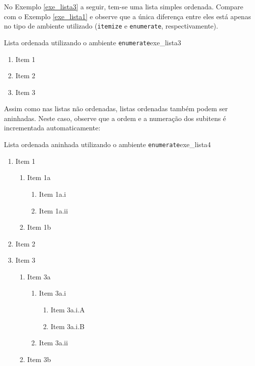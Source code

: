 No Exemplo \ref{exe_lista3} a seguir, tem-se uma lista simples ordenada. Compare com o Exemplo \ref{exe_lista1} e observe que a única diferença entre eles está apenas no tipo de ambiente utilizado ({\tt itemize} e {\tt enumerate}, respectivamente).

\begingroup
\renewcommand{\labelenumi}{\arabic{enumi}.}
\begin{texexptitled}[breakable,enhanced,middle=2mm]{Lista ordenada utilizando o ambiente \texttt{enumerate}}{exe_lista3}
\begin{enumerate}
    \item Item 1
    \item Item 2
    \item Item 3
\end{enumerate}
\end{texexptitled}
\endgroup

Assim como nas listas não ordenadas, listas ordenadas também podem ser aninhadas. Neste caso, observe que a ordem e a numeração dos subitens é incrementada automaticamente:

\begingroup
\renewcommand{\labelenumi}{\arabic{enumi}.}
\renewcommand{\labelenumii}{(\alph{enumii})}
\renewcommand{\labelenumiii}{\roman{enumiii}.}
\renewcommand{\labelenumiv}{\Alph{enumiv}.}
\begin{texexptitled}[breakable,enhanced,middle=2mm]{Lista ordenada aninhada utilizando o ambiente \texttt{enumerate}}{exe_lista4}
\begin{enumerate}
    \item Item 1
    \begin{enumerate}
        \item Item 1a
        \begin{enumerate}
            \item Item 1a.i
            \item Item 1a.ii
        \end{enumerate}
        \item Item 1b
    \end{enumerate}
    \item Item 2
    \item Item 3
    \begin{enumerate}
        \item Item 3a
         \begin{enumerate}
            \item Item 3a.i
            \begin{enumerate}
                \item Item 3a.i.A
                \item Item 3a.i.B
            \end{enumerate}
            \item Item 3a.ii
        \end{enumerate}
        \item Item 3b
    \end{enumerate}
\end{enumerate}
\end{texexptitled}
\endgroup

